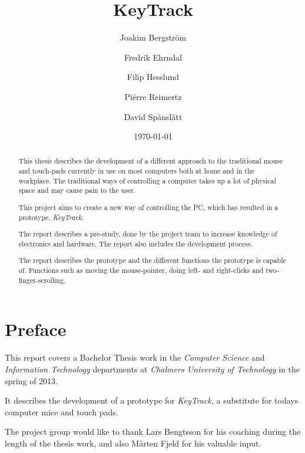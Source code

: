 \documentclass[a4paper,11pt]{article}
\begin{document}
\lstset{language=C++}
\title{KeyTrack}
\author{Joakim Bergström\\ \and Fredrik Ehrndal\\ \and Filip Hesslund\\
	 \and Pi\'erre Reimertz\\ \and David Spånslätt}
	
\date{\today}
\maketitle
\thispagestyle{empty}

\newpage

\setcounter{page}{1}

\section*{Preface}
This report covers a Bachelor Thesis work in the \emph{Computer Science} and
\emph{Information Technology} departments at \emph{Chalmers University of Technology}
in the spring of 2013.

It describes the development of a prototype for \emph{KeyTrack}, a substitute for todays
computer mice and touch pads.

The project group would like to thank Lars Bengtsson for his coaching during the length
of the thesis work, and also Mårten Fjeld for his valuable input.

\newpage

\begin{abstract}
This thesis describes the development of a different approach to the traditional mouse
and touch-pads currently in use on most computers both at home and in the workplace.
The traditional ways of controlling a computer takes up a lot of physical space and may
cause pain to the user.

This project aims to create a new way of controlling the PC, which has resulted in a prototype,
\emph{KeyTrack}.

The report describes a pre-study, done by the project team to increase knowledge of electronics
and hardware. The report also includes the development process.

The report describes the prototype and the different functions the prototype is capable of.
Functions such as moving the mouse-pointer, doing left- and right-clicks and two-finger-scrolling.
\end{abstract}
\newpage
\end{document}
